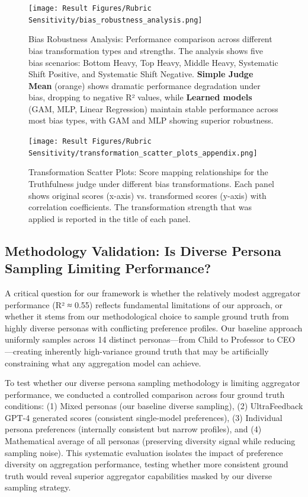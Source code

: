 \begin{figure}[H]
    \centering
    \texttt{[image: Result Figures/Rubric Sensitivity/bias\_robustness\_analysis.png]}
    \caption{Bias Robustness Analysis: Performance comparison across different bias transformation types and strengths. The analysis shows five bias scenarios: Bottom Heavy, Top Heavy, Middle Heavy, Systematic Shift Positive, and Systematic Shift Negative. \textbf{Simple Judge Mean} (orange) shows dramatic performance degradation under bias, dropping to negative R² values, while \textbf{Learned models} (GAM, MLP, Linear Regression) maintain stable performance across most bias types, with GAM and MLP showing superior robustness.}
    \label{fig:bias_robustness}
\end{figure}

\begin{figure}[H]
    \centering
    \texttt{[image: Result Figures/Rubric Sensitivity/transformation\_scatter\_plots\_appendix.png]}
    \caption{Transformation Scatter Plots: Score mapping relationships for the Truthfulness judge under different bias transformations. Each panel shows original scores (x-axis) vs. transformed scores (y-axis) with correlation coefficients. The transformation strength that was applied is reported in the title of each panel.}
    \label{fig:transformation_scatter}
\end{figure}

\subsection{Methodology Validation: Is Diverse Persona Sampling Limiting Performance?}

A critical question for our framework is whether the relatively modest aggregator performance (R² ≈ 0.55) reflects fundamental limitations of our approach, or whether it stems from our methodological choice to sample ground truth from highly diverse personas with conflicting preference profiles. Our baseline approach uniformly samples across 14 distinct personas—from Child to Professor to CEO—creating inherently high-variance ground truth that may be artificially constraining what any aggregation model can achieve.

To test whether our diverse persona sampling methodology is limiting aggregator performance, we conducted a controlled comparison across four ground truth conditions: (1) Mixed personas (our baseline diverse sampling), (2) UltraFeedback GPT-4 generated scores (consistent single-model preferences), (3) Individual persona preferences (internally consistent but narrow profiles), and (4) Mathematical average of all personas (preserving diversity signal while reducing sampling noise). This systematic evaluation isolates the impact of preference diversity on aggregation performance, testing whether more consistent ground truth would reveal superior aggregator capabilities masked by our diverse sampling strategy.

